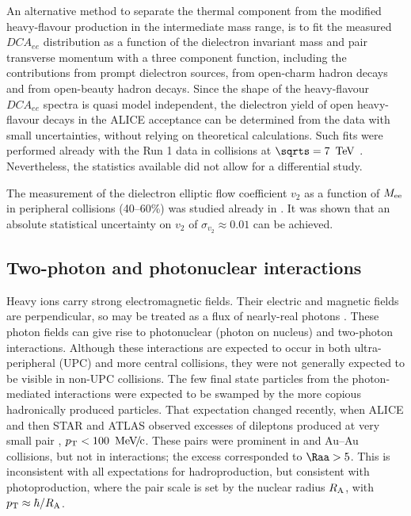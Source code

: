 \documentclass[../report.tex]{subfiles}
\begin{document}
An alternative method to separate the thermal component from the modified heavy-flavour production in the intermediate mass range, is to fit the measured $DCA_{ee}$ distribution as a function of the dielectron invariant mass and pair transverse momentum with a three component function, including the contributions from prompt dielectron sources, from open-charm hadron decays and from open-beauty hadron decays. Since the shape of the heavy-flavour $DCA_{ee}$ spectra is quasi model independent, the dielectron yield of open heavy-flavour decays in the ALICE acceptance can be determined from the data with small uncertainties, without relying on theoretical calculations. Such fits were performed already with the Run 1 data in \pp{} collisions at $\sqrts = \unit[7]{\UTeV}$ \cite{Acharya:2018ohw}. Nevertheless, the statistics available did not allow for a differential study.    

The measurement of the dielectron elliptic flow coefficient $v_2$ as a function of $M_{\rm ee}$ in peripheral \PbPb{} collisions (40--60\%) was studied already in \cite{Abelevetal:2014cna}. It was shown that an absolute statistical uncertainty on $v_2$ of $\sigma_{v_2} \approx 0.01$ can be achieved.

\subsection{Two-photon and photonuclear interactions}
\label{sec:dileptons:peripheral}

Heavy ions carry strong electromagnetic fields.  Their electric and magnetic fields are perpendicular, so may be treated as a flux of nearly-real photons \cite{Bertulani:2005ru}.  These photon fields can give rise to photonuclear (photon on nucleus) and two-photon interactions.  Although these interactions are expected to occur in both ultra-peripheral (UPC) and more central collisions, they were not generally expected to be visible in non-UPC collisions.  The few final state particles from the photon-mediated interactions were expected to be swamped by the more copious hadronically produced particles.   That expectation changed recently, when ALICE \cite{Adam:2015gba} and then STAR \cite{Adam:2018tdm,Zha:2018ohg} and ATLAS \cite{Aaboud:2018eph} observed excesses of dileptons produced at very small pair \pT, $\pT < \unit[100]{\UMeVc}$.   These pairs were prominent in \PbPb{} and Au--Au collisions, but not in \pp{} interactions; the excess corresponded to $\Raa >5$.  This is inconsistent with all expectations for hadroproduction, but  consistent with photoproduction, where the pair \pT{} scale is set by the nuclear radius $R_{\rm A}$, with $p\sb{\scriptstyle\mathrm{T}} \approx \hbar/R_{\rm A}$. 
\end{document}
